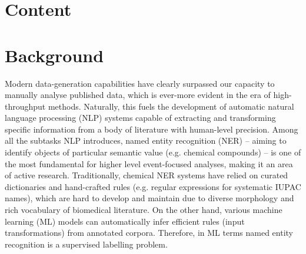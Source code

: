 \documentclass[twocolumn]{bmcart}%
\begin{document}


\section*{Content}

\section*{Background}
Modern data-generation capabilities have clearly surpassed our capacity to manually analyse published data, which is ever-more evident in the era of high-throughput methods. 
Naturally, this fuels the development of automatic natural language processing (NLP) systems capable of extracting and transforming specific information from a body of literature with human-level precision. 
Among all the subtasks NLP introduces, named entity recognition (NER) -- aiming to identify objects of particular semantic value (e.g. chemical compounds) -- is one of the most fundamental for higher level event-focused analyses, making it an area of active research.
Traditionally, chemical NER systems have relied on curated dictionaries and hand-crafted rules (e.g. regular expressions for systematic IUPAC names), which are hard to develop and maintain due to diverse morphology and rich vocabulary of biomedical literature. 
On the other hand, various machine learning (ML) models can automatically infer efficient rules (input transformations) from annotated corpora.
Therefore, in ML terms named entity recognition is a supervised labelling problem.
\end{document}
